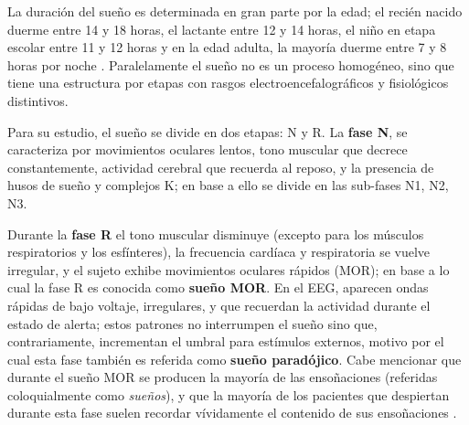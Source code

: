 La duración del sueño es determinada en gran parte por la edad; el recién nacido duerme entre 14 y 
18 horas, el lactante entre 12 y 14 horas, el niño en etapa escolar entre 11 y 12 horas y en la 
edad adulta, la mayoría duerme entre 7 y 8 horas por noche \cite{Contreras13}.
%
Paralelamente el sueño no es un proceso homogéneo, sino que tiene una estructura por etapas con 
rasgos electroencefalográficos y fisiológicos distintivos.

Para su estudio, el sueño se divide en dos etapas: N y R.
%
La \textbf{fase N}, se caracteriza por movimientos oculares lentos, tono muscular que decrece 
constantemente, actividad cerebral que recuerda al reposo, y la presencia de husos de sueño y 
complejos K; en base a ello se divide en las sub-fases N1, N2, N3.

Durante la \textbf{fase R} el tono muscular disminuye (excepto para los músculos respiratorios y 
los esfínteres), la frecuencia cardíaca y respiratoria se vuelve irregular, y el sujeto exhibe 
movimientos oculares rápidos (MOR); en base a lo cual la fase R es conocida como \textbf{sueño 
MOR}.
%
En el EEG, aparecen ondas rápidas de bajo voltaje, irregulares, y que recuerdan la actividad 
durante el estado de alerta; estos patrones no interrumpen el sueño sino que, contrariamente,
incrementan el umbral para estímulos externos, motivo por el cual esta fase también es referida 
como \textbf{sueño paradójico}.
%
Cabe mencionar que durante el sueño MOR se producen la mayoría de las ensoñaciones (referidas 
coloquialmente como \textit{sueños}), y que la mayoría de los pacientes que despiertan durante esta 
fase suelen recordar vívidamente el contenido de sus ensoñaciones \cite{Rosales14}.

